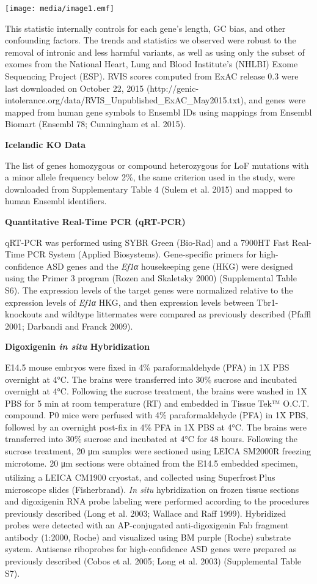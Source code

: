 \documentclass[]{article}
\begin{document}
\texttt{[image: media/image1.emf]}

This statistic internally controls for each gene's length, GC bias, and
other confounding factors. The trends and statistics we observed were
robust to the removal of intronic and less harmful variants, as well as
using only the subset of exomes from the National Heart, Lung and Blood
Institute's (NHLBI) Exome Sequencing Project (ESP). RVIS scores computed
from ExAC release 0.3 were last downloaded on October 22, 2015
(http://genic-intolerance.org/data/RVIS\_Unpublished\_ExAC\_May2015.txt),
and genes were mapped from human gene symbols to Ensembl IDs using
mappings from Ensembl Biomart (Ensembl 78; Cunningham et al. 2015).

\textbf{Icelandic KO Data}

The list of genes homozygous or compound heterozygous for LoF mutations
with a minor allele frequency below 2\%, the same criterion used in the
study, were downloaded from Supplementary Table 4 (Sulem et al. 2015)
and mapped to human Ensembl identifiers.

\textbf{Quantitative Real-Time PCR (qRT-PCR)}

qRT-PCR was performed using SYBR Green (Bio-Rad) and a 7900HT Fast
Real-Time PCR System (Applied Biosystems). Gene-speciﬁc primers for
high-confidence ASD genes and the \emph{Ef1α} housekeeping gene (HKG)
were designed using the Primer 3 program (Rozen and Skaletsky 2000)
(Supplemental Table S6). The expression levels of the target genes were
normalized relative to the expression levels of \emph{Ef1α} HKG, and
then expression levels between Tbr1-knockouts and wildtype littermates
were compared as previously described (Pfaffl 2001; Darbandi and Franck
2009).

\textbf{Digoxigenin \emph{in situ} Hybridization}

E14.5 mouse embryos were fixed in 4\% paraformaldehyde (PFA) in 1X PBS
overnight at 4°C. The brains were transferred into 30\% sucrose and
incubated overnight at 4°C. Following the sucrose treatment, the brains
were washed in 1X PBS for 5 min at room temperature (RT) and embedded in
Tissue Tek™ O.C.T. compound. P0 mice were perfused with 4\%
paraformaldehyde (PFA) in 1X PBS, followed by an overnight post-fix in
4\% PFA in 1X PBS at 4°C. The brains were transferred into 30\% sucrose
and incubated at 4°C for 48 hours. Following the sucrose treatment, 20
μm samples were sectioned using LEICA SM2000R freezing microtome. 20 μm
sections were obtained from the E14.5 embedded specimen, utilizing a
LEICA CM1900 cryostat, and collected using
Superfrost\textsuperscript{}Plus microscope slides (Fisherbrand).
\emph{In situ} hybridization on frozen tissue sections and digoxigenin
RNA probe labeling were performed according to the procedures previously
described (Long et al. 2003; Wallace and Raff 1999). Hybridized probes
were detected with an AP-conjugated anti-digoxigenin Fab fragment
antibody (1:2000, Roche) and visualized using BM purple (Roche)
substrate system. Antisense riboprobes for high-confidence ASD genes
were prepared as previously described (Cobos et al. 2005; Long et al.
2003) (Supplemental Table S7).
\end{document}
